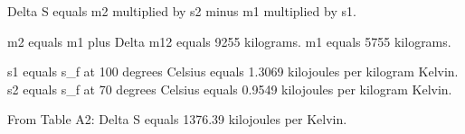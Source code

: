 Delta S equals m2 multiplied by s2 minus m1 multiplied by s1.  

m2 equals m1 plus Delta m12 equals 9255 kilograms.  
m1 equals 5755 kilograms.  

s1 equals s_f at 100 degrees Celsius equals 1.3069 kilojoules per kilogram Kelvin.  
s2 equals s_f at 70 degrees Celsius equals 0.9549 kilojoules per kilogram Kelvin.  

From Table A2:  
Delta S equals 1376.39 kilojoules per Kelvin.
